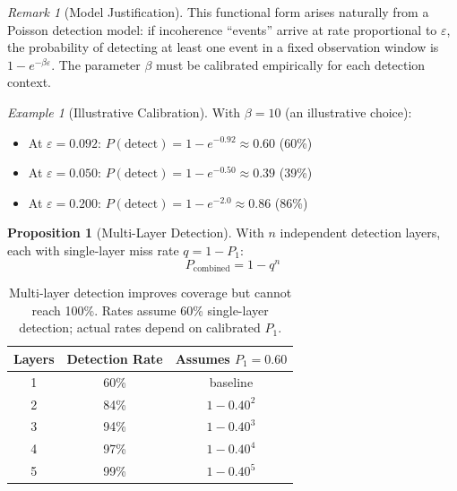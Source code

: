 \documentclass[11pt,a4paper]{article}
\theoremstyle{definition}
\newtheorem{proposition}[theorem]{Proposition}
\theoremstyle{remark}
\newtheorem{remark}{Remark}[section]
\newtheorem{example}{Example}[section]
\begin{document}
\begin{remark}[Model Justification]
This functional form arises naturally from a Poisson detection model: if incoherence ``events'' arrive at rate proportional to $\varepsilon$, the probability of detecting at least one event in a fixed observation window is $1 - e^{-\beta\varepsilon}$. The parameter $\beta$ must be calibrated empirically for each detection context.
\end{remark}

\begin{example}[Illustrative Calibration]
With $\beta = 10$ (an illustrative choice):
\begin{itemize}[noitemsep]
    \item At $\varepsilon = 0.092$: $P(\text{detect}) = 1 - e^{-0.92} \approx 0.60$ (60\%)
    \item At $\varepsilon = 0.050$: $P(\text{detect}) = 1 - e^{-0.50} \approx 0.39$ (39\%)
    \item At $\varepsilon = 0.200$: $P(\text{detect}) = 1 - e^{-2.0} \approx 0.86$ (86\%)
\end{itemize}
\end{example}

\begin{proposition}[Multi-Layer Detection]
With $n$ independent detection layers, each with single-layer miss rate $q = 1 - P_1$:
\begin{equation}
P_{\text{combined}} = 1 - q^n
\end{equation}
\end{proposition}

\begin{table}[H]
\centering
\begin{tabular}{ccc}
\toprule
\textbf{Layers} & \textbf{Detection Rate} & \textbf{Assumes $P_1 = 0.60$} \\
\midrule
1 & 60\% & baseline \\
2 & 84\% & $1 - 0.40^2$ \\
3 & 94\% & $1 - 0.40^3$ \\
4 & 97\% & $1 - 0.40^4$ \\
5 & 99\% & $1 - 0.40^5$ \\
\bottomrule
\end{tabular}
\caption{Multi-layer detection improves coverage but cannot reach 100\%. Rates assume 60\% single-layer detection; actual rates depend on calibrated $P_1$.}
\end{table}

\end{document}
